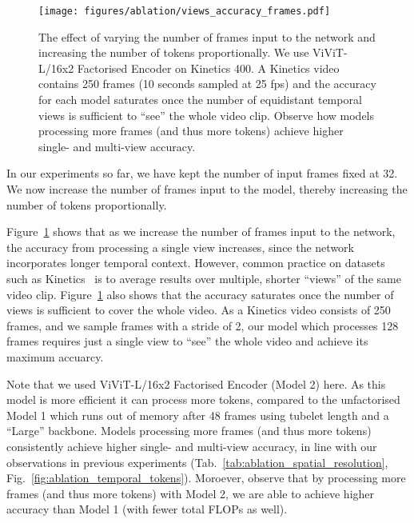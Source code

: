 \documentclass[10pt,twocolumn,letterpaper]{article}
\makeatletter
\renewcommand{\paragraph}{\@startsection{paragraph}{4}{\z@}{1.625ex \@plus 1ex \@minus .2ex}{-1em}{\normalfont\normalsize\bfseries}}
\makeatother
\begin{document}
 \begin{figure}[tb]
	\centering
	\texttt{[image: figures/ablation/views\_accuracy\_frames.pdf]}
	\caption{
		The effect of varying the number of frames input to the network and increasing the number of tokens proportionally.
		We use ViViT-L/16x2 Factorised Encoder on Kinetics 400.
		A Kinetics video contains 250 frames (10 seconds sampled at 25 fps) and the accuracy for each model saturates once the number of equidistant temporal views is sufficient to ``see'' the whole video clip.
		Observe how models processing more frames (and thus more tokens) achieve higher single- and multi-view accuracy.
	}
	\label{fig:ablation_num_frames}
	\vspace{-\baselineskip}
\end{figure} \paragraph{Varying the number of input frames}




In our experiments so far, we have kept the number of input frames fixed at 32.
We now increase the number of frames input to the model, thereby increasing the number of tokens proportionally.

Figure~\ref{fig:ablation_num_frames} shows that as we increase the number of frames input to the network, the accuracy from processing a single view increases, since the network incorporates longer temporal context.
However, common practice on datasets such as Kinetics~\cite{feichtenhofer_iccv_2019, wang_cvpr_2018, li_tea_cvpr_2020} is to average results over multiple, shorter ``views'' of the same video clip.
Figure~\ref{fig:ablation_num_frames} also shows that the accuracy saturates once the number of views is sufficient to cover the whole video.
As a Kinetics video consists of 250 frames, and we sample frames with a stride of 2, our model which processes 128 frames requires just a single view to ``see'' the whole video and achieve its maximum accuarcy.

Note that we used  ViViT-L/16x2 Factorised Encoder (Model 2) here.
As this model is more efficient it can process more tokens, compared to the unfactorised Model 1 which runs out of memory after 48 frames using tubelet length  and a ``Large'' backbone.
Models processing more frames (and thus more tokens) consistently achieve higher single- and multi-view accuracy, in line with our observations in previous experiments (Tab.~\ref{tab:ablation_spatial_resolution}, Fig.~\ref{fig:ablation_temporal_tokens}).
Moroever, observe that by processing more frames (and thus more tokens) with Model 2, we are able to achieve higher accuracy than Model 1 (with fewer total FLOPs as well).
\end{document}
